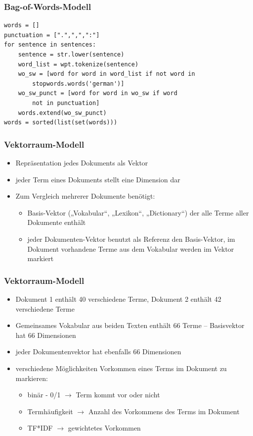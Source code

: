 \begin{frame}[fragile]
    \frametitle{Bag-of-Words-Modell}
     
    \begin{verbatim}
words = []
punctuation = [".",",",":"]
for sentence in sentences:
    sentence = str.lower(sentence)
    word_list = wpt.tokenize(sentence)
    wo_sw = [word for word in word_list if not word in 
        stopwords.words('german')]
    wo_sw_punct = [word for word in wo_sw if word
        not in punctuation]
    words.extend(wo_sw_punct)          
words = sorted(list(set(words)))
    \end{verbatim}
\end{frame}
    
    
\begin{frame}
    \frametitle{Vektorraum-Modell}
    \begin{itemize}
    \item Repräsentation jedes Dokuments als Vektor
    \item jeder Term eines Dokuments stellt eine Dimension dar 
    \item Zum Vergleich mehrerer Dokumente benötigt:
    \begin{itemize}
    \item Basis-Vektor („Vokabular“, „Lexikon“, „Dictionary“) der alle Terme aller Dokumente enthält
    \item jeder Dokumenten-Vektor benutzt als Referenz den Basis-Vektor, im Dokument vorhandene Terme aus dem 
    Vokabular werden im Vektor markiert
    \end{itemize}
    \end{itemize}
\end{frame}
    
    
\begin{frame}
    \frametitle{Vektorraum-Modell}
    \begin{itemize}
    \item Dokument 1 enthält 40 verschiedene Terme, Dokument 2 enthält 42 verschiedene Terme
    \item Gemeinsames Vokabular aus beiden Texten enthält 66 Terme -- Basisvektor hat 66 Dimensionen
    \item jeder Dokumentenvektor hat ebenfalls 66 Dimensionen
    \item verschiedene Möglichkeiten Vorkommen eines Terms im Dokument zu markieren:
    \begin{itemize}
    \item binär - 0/1  $\rightarrow$ Term kommt vor oder nicht
    \item Termhäufigkeit  $\rightarrow$ Anzahl des Vorkommens des Terms im Dokument
    \item TF*IDF  $\rightarrow$ gewichtetes Vorkommen
    \end{itemize}
    \end{itemize}
\end{frame}
    
